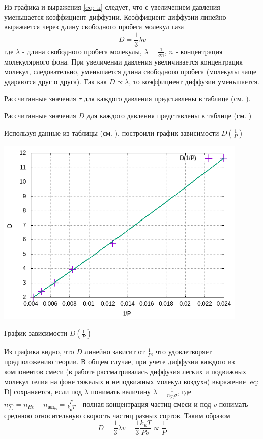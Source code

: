Из графика и выражения \eqref{eq: k} следует, что с увеличением давления уменьшается коэффициент диффузии. Коэффициент диффузии линейно выражается через длину свободного пробега молекул газа
\begin{equation}
    D = \frac{1}{3} \lambda v \label{eq: D}
\end{equation}
где $\lambda$ - длина свободного пробега молекулы, 
$\lambda = \frac{1}{\sigma n}$,
$n$ - концентрация молекулярного фона.
При увеличении давления увеличивается концентрация молекул, следовательно, уменьшается длина свободного пробега (молекулы чаще ударяются друг о друга). Так как $D \propto \lambda$, то коэффициент диффузии уменьшается.

Рассчитанные значения $\tau$ для каждого давления представлены в таблице (см. ).

Рассчитанные значения $D$ для каждого давления представлены в таблице (см. )

Используя данные из таблицы (см. ), построили график зависимости $D(\frac{1}{P})$

\begin{center}
    \includegraphics[width=0.9\textwidth]{img/graph3 (1).png}
    
    График зависимости $D(\frac{1}{P})$
\end{center}

Из графика видно, что $D$ линейно зависит от $\frac{1}{P}$, что удовлетворяет предположению теории.  В общем случае, при учете диффузии каждого из компонентов смеси (в работе рассматривалась диффузия легких и подвижных молекул гелия на фоне тяжелых и неподвижных молекул воздуха) выражение \eqref{eq: D} сохраняется, если под $\lambda$ понимать величину $\lambda = \frac{1}{n_{\sum}\sigma}$, где $n_{\sum} = n_{He}+n_{\text{возд}} = \frac{P}{k_\text{Б}T}$ - полная концентрация частиц смеси и под $v$ понимать среднюю относительную скорость частиц разных сортов. Таким образом 
    \begin{equation}
        D = \frac{1}{3}\lambda v = \frac{1}{3}\frac{k_{\text{Б}}T}{P\sigma} \propto \frac{1}{P}
    \end{equation}

